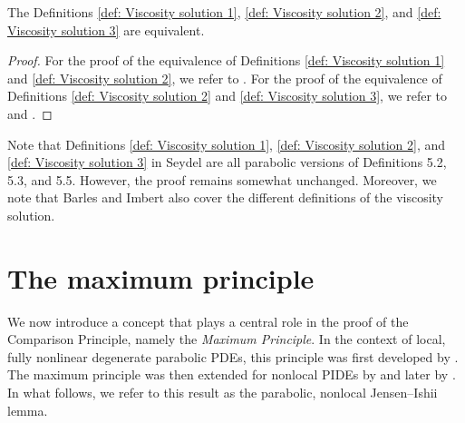 \begin{proposition} 
\label{prop: Propositions 5.4 and 5.6 in Seydel}
    The Definitions \ref{def: Viscosity solution 1}, \ref{def: Viscosity solution 2}, and \ref{def: Viscosity solution 3} are equivalent. 
\end{proposition}
\begin{proof}
    For the proof of the equivalence of Definitions \ref{def: Viscosity solution 1} and \ref{def: Viscosity solution 2}, we refer to {\cite[Proposition 5.4]{seydel2010generalexistenceuniquenessviscosity}}. For the proof of the equivalence of Definitions \ref{def: Viscosity solution 2} and \ref{def: Viscosity solution 3}, we refer to {\cite[Proposition 5.6]{seydel2010generalexistenceuniquenessviscosity}} and \cite{barles2008second}.
\end{proof}
\begin{remark}
    Note that Definitions \ref{def: Viscosity solution 1}, \ref{def: Viscosity solution 2}, and \ref{def: Viscosity solution 3} in Seydel \cite{seydel2010generalexistenceuniquenessviscosity} are all parabolic versions of Definitions 5.2, 5.3, and 5.5. However, the proof remains somewhat unchanged. Moreover, we note that Barles and Imbert \cite[Chapter 1]{barles2008second} also cover the different definitions of the viscosity solution.
\end{remark}

\section{The maximum principle}
\label{section: Maximum Principle}
We now introduce a concept that plays a central role in the proof of the Comparison Principle, namely the \emph{Maximum Principle}. In the context of local, fully nonlinear degenerate parabolic PDEs, this principle was first developed by \textcite{crandall1990maximum}. The maximum principle was then extended for nonlocal PIDEs by \textcite{jakobsen2006maximum} and later by \textcite{barles2008second}. In what follows, we refer to this result as the parabolic, nonlocal Jensen–Ishii lemma.

